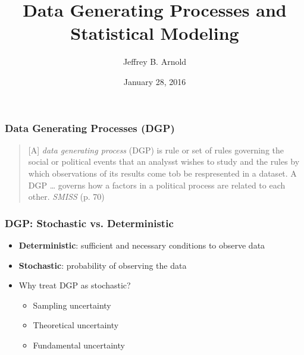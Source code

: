 \documentclass{beamer}
\title{Data Generating Processes and Statistical Modeling}
\author{Jeffrey B. Arnold}
\date{January 28, 2016}
\begin{document}
\begin{frame}
  \maketitle{}
\end{frame}

\begin{frame}
  \frametitle{Data Generating Processes (DGP)}

  \begin{center}
  \end{center}

  \begin{quote}
    [A] \textit{data generating process} (DGP) is rule or set of rules governing the social or political events that an analysst wishes to study and the rules by which observations of its results come tob be respresented in a dataset. A DGP \dots{} governs how a factors in a political process are related to each other. \textit{SMISS} (p. 70)
  \end{quote}

\end{frame}

\begin{frame}
  \frametitle{DGP: Stochastic vs. Deterministic}
  
  \begin{itemize}
  \item \textbf{Deterministic}: sufficient and necessary conditions to observe data
  \item \textbf{Stochastic}: probability of observing the data
  \item Why treat DGP as stochastic?
    \begin{itemize}
    \item Sampling uncertainty
    \item Theoretical uncertainty
    \item Fundamental uncertainty
    \end{itemize}
  \end{itemize}
\end{frame}
\end{document}
